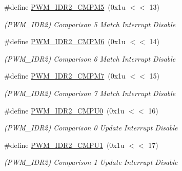 \begin{DoxyCompactItemize}
\mbox{\label{group__SAMS70__PWM_gaaeddaa7bca051fe5112906cd2c9393cd}} 
\#define \mbox{\hyperlink{group__SAMS70__PWM_gaaeddaa7bca051fe5112906cd2c9393cd}{P\+W\+M\+\_\+\+I\+D\+R2\+\_\+\+C\+M\+P\+M5}}~(0x1u $<$$<$ 13)
\begin{DoxyCompactList}\small\item\em (P\+W\+M\+\_\+\+I\+D\+R2) Comparison 5 Match Interrupt Disable \end{DoxyCompactList}\item 
\mbox{\label{group__SAMS70__PWM_ga8cd11a0634a985265b9aade0459a91e6}} 
\#define \mbox{\hyperlink{group__SAMS70__PWM_ga8cd11a0634a985265b9aade0459a91e6}{P\+W\+M\+\_\+\+I\+D\+R2\+\_\+\+C\+M\+P\+M6}}~(0x1u $<$$<$ 14)
\begin{DoxyCompactList}\small\item\em (P\+W\+M\+\_\+\+I\+D\+R2) Comparison 6 Match Interrupt Disable \end{DoxyCompactList}\item 
\mbox{\label{group__SAMS70__PWM_gabc7b93057992ff6fc2052969a73a7654}} 
\#define \mbox{\hyperlink{group__SAMS70__PWM_gabc7b93057992ff6fc2052969a73a7654}{P\+W\+M\+\_\+\+I\+D\+R2\+\_\+\+C\+M\+P\+M7}}~(0x1u $<$$<$ 15)
\begin{DoxyCompactList}\small\item\em (P\+W\+M\+\_\+\+I\+D\+R2) Comparison 7 Match Interrupt Disable \end{DoxyCompactList}\item 
\mbox{\label{group__SAMS70__PWM_ga127c7d3f21eebb3c2404e5295c373567}} 
\#define \mbox{\hyperlink{group__SAMS70__PWM_ga127c7d3f21eebb3c2404e5295c373567}{P\+W\+M\+\_\+\+I\+D\+R2\+\_\+\+C\+M\+P\+U0}}~(0x1u $<$$<$ 16)
\begin{DoxyCompactList}\small\item\em (P\+W\+M\+\_\+\+I\+D\+R2) Comparison 0 Update Interrupt Disable \end{DoxyCompactList}\item 
\mbox{\label{group__SAMS70__PWM_ga5c5a299736bbcce28d62a005a967fd6d}} 
\#define \mbox{\hyperlink{group__SAMS70__PWM_ga5c5a299736bbcce28d62a005a967fd6d}{P\+W\+M\+\_\+\+I\+D\+R2\+\_\+\+C\+M\+P\+U1}}~(0x1u $<$$<$ 17)
\begin{DoxyCompactList}\small\item\em (P\+W\+M\+\_\+\+I\+D\+R2) Comparison 1 Update Interrupt Disable \end{DoxyCompactList}\item 
$$
\end{DoxyCompactItemize}
